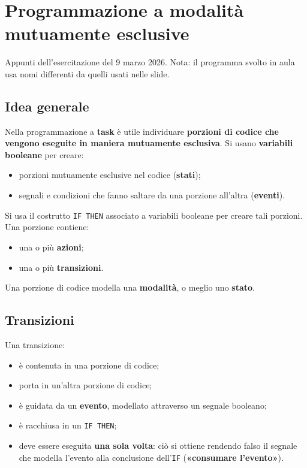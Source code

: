 \chapter{Programmazione a modalità mutuamente esclusive}
\label{cap:modalita-esclusive}

\begin{note}[Origine]
Appunti dell'esercitazione del 9 marzo 2026. Nota: il programma svolto in aula usa nomi differenti da quelli usati nelle slide.
\end{note}

\section{Idea generale}
Nella programmazione a \textbf{task} è utile individuare \textbf{porzioni di codice che vengono eseguite in maniera mutuamente esclusiva}. Si usano \textbf{variabili booleane} per creare:
\begin{itemize}
    \item porzioni mutuamente esclusive nel codice (\textbf{stati});
    \item segnali e condizioni che fanno saltare da una porzione all'altra (\textbf{eventi}).
\end{itemize}

Si usa il costrutto \texttt{IF THEN} associato a variabili booleane per creare tali porzioni. Una porzione contiene:
\begin{itemize}
    \item una o più \textbf{azioni};
    \item una o più \textbf{transizioni}.
\end{itemize}
Una porzione di codice modella una \textbf{modalità}, o meglio uno \textbf{stato}.

\section{Transizioni}
\begin{defn}[Transizione]
Una transizione:
\begin{itemize}
    \item è contenuta in una porzione di codice;
    \item porta in un'altra porzione di codice;
    \item è guidata da un \textbf{evento}, modellato attraverso un segnale booleano;
    \item è racchiusa in un \texttt{IF THEN};
    \item deve essere eseguita \textbf{una sola volta}: ciò si ottiene rendendo falso il segnale che modella l'evento alla conclusione dell'\texttt{IF} (\textbf{«consumare l'evento»}).
\end{itemize}
\end{defn}

